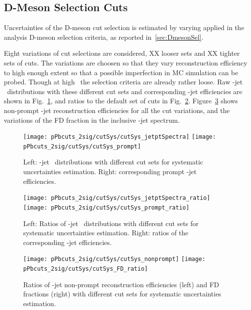 \subsection{D-Meson Selection Cuts}
Uncertainties of the D-meson cut selection is estimated by varying applied in the analysis D-meson selection criteria, as reported in~\ref{sec:DmesonSel}. 

Eight variations of cut selections are considered, {\color{red} XX} looser sets and {\color{red} XX} tighter sets of cuts. The variations are choosen so that they vary \Dzero reconstruction efficiency to high enough extent so that a possible imperfection in MC simulation can be probed. Though at high \ptd\ the selection criteria are already rather loose.
Raw \Dzero-jet \pt\ distributions with these different cut sets and corresponding \Dzero-jet efficiencies are shown in Fig.~\ref{fig:JetPtRawSys_Dzero}, and ratios to the default set of cuts in Fig.~\ref{fig:JetPtRawSysRatio_Dzero}.
Figure~\ref{fig:JetcutVarFD_Dzero} shows non-prompt \Dzero-jet reconstruction efficiencies for all the cut variations, and the variations of the FD fraction in the inclusive \Dzero-jet spectrum.

\begin{figure}[bth]
\begin{center}
\texttt{[image: pPbcuts\_2sig/cutSys/cutSys\_jetptSpectra]}
\texttt{[image: pPbcuts\_2sig/cutSys/cutSys\_prompt]}
\caption{Left: \Dzero-jet \pt\ distributions with different cut sets for systematic uncertainties estimation. Right: corresponding prompt \Dzero-jet efficiencies.} 
\label{fig:JetPtRawSys_Dzero}
\end{center}
\end{figure}

\begin{figure}[bth]
\begin{center}
\texttt{[image: pPbcuts\_2sig/cutSys/cutSys\_jetptSpectra\_ratio]}
\texttt{[image: pPbcuts\_2sig/cutSys/cutSys\_prompt\_ratio]}
\caption{Left: Ratios of \Dzero-jet \pt\ distributions with different cut sets for systematic uncertainties estimation. Right: ratios of the corresponding \Dzero-jet efficiencies.} 
\label{fig:JetPtRawSysRatio_Dzero}
\end{center}
\end{figure}

\begin{figure}[bth]
\begin{center}
\texttt{[image: pPbcuts\_2sig/cutSys/cutSys\_nonprompt]}
\texttt{[image: pPbcuts\_2sig/cutSys/cutSys\_FD\_ratio]}
\caption{Ratios of \Dzero-jet non-prompt reconstruction efficiencies (left) and FD fractions (right) with different cut sets for systematic uncertainties estimation.} 
\label{fig:JetcutVarFD_Dzero}
\end{center}
\end{figure} 


